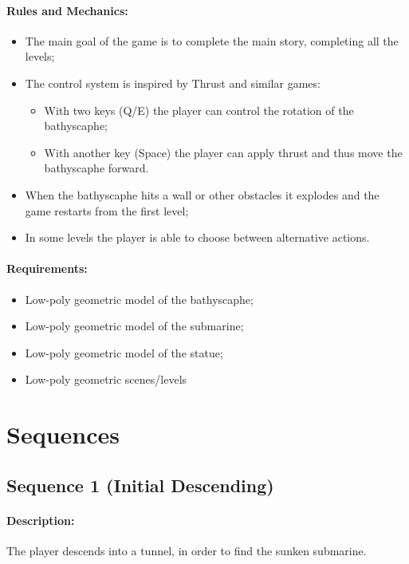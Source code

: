 \documentclass{article}
\begin{document}
\paragraph{Rules and Mechanics: } 
\begin{itemize}
\item The main goal of the game is to complete the main story, completing all the levels;
\item The control system is inspired by Thrust and similar games: 
	\begin{itemize}
	\item With two keys (Q/E) the player can control the rotation of the bathyscaphe;
	\item With another key (Space) the player can apply thrust and thus move the bathyscaphe forward.
	\end{itemize}
\item When the bathyscaphe hits a wall or other obstacles it explodes and the game restarts from the first level;
\item In some levels the player is able to choose between alternative actions.
\end{itemize}

\paragraph{Requirements: } \begin{itemize}
\item Low-poly geometric model of the bathyscaphe;
\item Low-poly geometric model of the submarine;
\item Low-poly geometric model of the statue;
\item Low-poly geometric scenes/levels
\end{itemize}


\section{Sequences}
\subsection{Sequence 1 (Initial Descending)}

\paragraph{Description: } The player descends into a tunnel, in order to find the sunken submarine.
\end{document}
